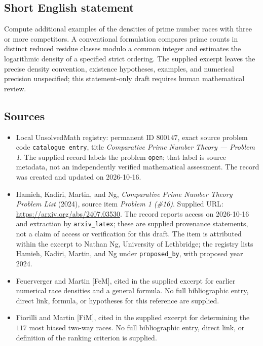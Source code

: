 \documentclass[11pt]{article}
\begin{document}
\subsection{Short English statement}
Compute additional examples of the densities of prime number races with three or more competitors. A conventional formulation compares prime counts in distinct reduced residue classes modulo a common integer and estimates the logarithmic density of a specified strict ordering. The supplied excerpt leaves the precise density convention, existence hypotheses, examples, and numerical precision unspecified; this statement-only draft requires human mathematical review.
\subsection{Sources}
\begin{itemize}
\item Local UnsolvedMath registry: permanent ID \(800147\), exact source problem code \texttt{catalogue entry}, title \emph{Comparative Prime Number Theory --- Problem 1}. The supplied record labels the problem \texttt{open}; that label is source metadata, not an independently verified mathematical assessment. The record was created and updated on 2026-10-16.
\item Hamieh, Kadiri, Martin, and Ng, \emph{Comparative Prime Number Theory Problem List} (2024), source item \emph{Problem 1 (\#16)}. Supplied URL: \url{https://arxiv.org/abs/2407.03530}. The record reports access on 2026-10-16 and extraction by \texttt{arxiv\_latex}; these are supplied provenance statements, not a claim of access or verification for this draft. The item is attributed within the excerpt to Nathan Ng, University of Lethbridge; the registry lists Hamieh, Kadiri, Martin, and Ng under \texttt{proposed\_by}, with proposed year 2024.
\item Feuerverger and Martin [FeM], cited in the supplied excerpt for earlier numerical race densities and a general formula. No full bibliographic entry, direct link, formula, or hypotheses for this reference are supplied.
\item Fiorilli and Martin [FiM], cited in the supplied excerpt for determining the \(117\) most biased two-way races. No full bibliographic entry, direct link, or definition of the ranking criterion is supplied.
\end{itemize}
\end{document}
